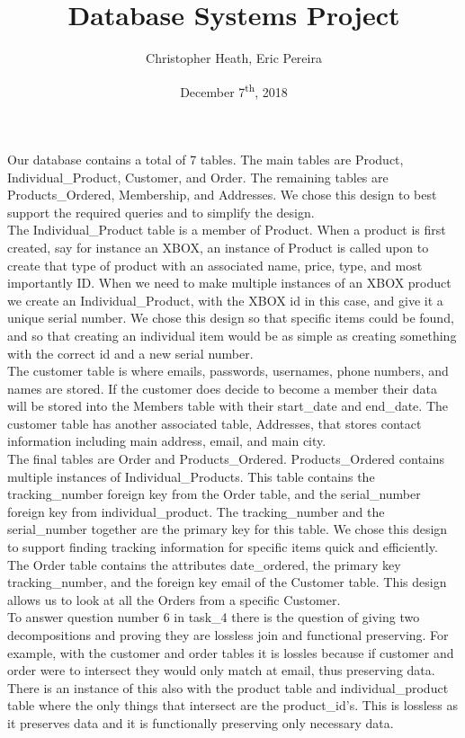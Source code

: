 \documentclass[12pt]{article}
\newcommand\tab[1][1cm]{\hspace*{#1}}
\begin{document}
	

\begin{titlepage}
	
\author{Christopher Heath, Eric Pereira}
\date{December 7\textsuperscript{th}, 2018}
\title{Database Systems Project}

\maketitle

\end{titlepage}


\newpage {}

\tab Our database contains a total of 7 tables. The main tables are Product, Individual\_Product, Customer, and Order. The remaining tables are Products\_Ordered, Membership, and Addresses. We chose this design to best support the required queries and to simplify the design. \\
\tab The Individual\_Product table is a member of Product. When a product is first created, say for instance an XBOX, an instance of Product is called upon to create that type of product with an associated name, price, type, and most importantly ID. When we need to make multiple instances of an XBOX product we create an Individual\_Product, with the XBOX id in this case, and give it a unique serial number. We chose this design so that specific items could be found, and so that creating an individual item would be as simple as creating something with the correct id and a new serial number. \\
\tab The customer table is where emails, passwords, usernames, phone numbers, and names are stored. If the customer does decide to become a member their data will be stored into the Members table with their start\_date and end\_date. The customer table has another associated table, Addresses, that stores contact information including main address, email, and main city. \\
\tab The final tables are Order and Products\_Ordered. Products\_Ordered contains multiple
 instances of Individual\_Products. This table contains the tracking\_number foreign key from
  the Order table, and the serial\_number foreign key from individual\_product. The
   tracking\_number and the serial\_number together are the primary key for this table. We
    chose this design to support finding tracking information for specific items quick and
     efficiently. The Order table contains the attributes date\_ordered, the primary key
      tracking\_number, and the foreign key email of the Customer table. This design allows us to
       look at all the Orders from a specific Customer. \\
\tab To answer question number 6 in task\_4 there is the question of giving two decompositions and proving they are lossless join and functional preserving. For example, with the customer and order tables it is lossles because if customer and order were to intersect they would only match at email, thus preserving data. There is an instance of this also with the product table and individual\_product table where the only things that intersect are the product\_id's. This is lossless as it preserves data and it is functionally preserving only necessary data.
\end{document}
